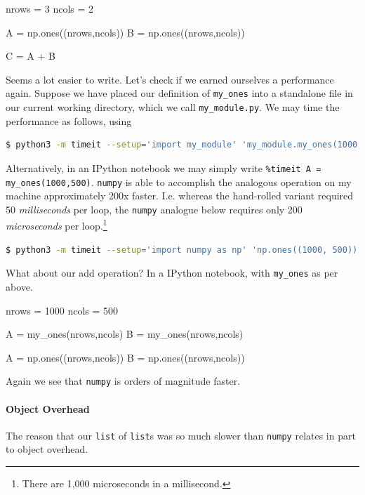 \documentclass[12pt,letterpaper,twoside]{article}
\begin{document}
\begin{python}
nrows = 3
ncols = 2

A = np.ones((nrows,ncols))
B = np.ones((nrows,ncols))

C = A + B
\end{python}

Seems a lot easier to write. Let's check if we earned ourselves a performance again.
Suppose we have placed our definition of \texttt{my\_ones} into a
standalone file in our current working directory, which we call
\texttt{my\_module.py}. We may time the performance as
follows, using
\begin{lstlisting}[language=bash,basicstyle=\small]
  $ python3 -m timeit --setup='import my_module' 'my_module.my_ones(1000, 500)'
\end{lstlisting}

Alternatively, in an IPython notebook we may simply
write \texttt{\%timeit A = my\_ones(1000,500)}.
\texttt{numpy} is able to accomplish the analogous operation on my
machine approximately 200x faster. I.e. whereas the hand-rolled variant required
50 \emph{milliseconds} per loop, the \texttt{numpy} analogue below
requires only 200 \emph{microseconds} per loop.\footnote{There are 1,000
microseconds in a millisecond.}

\begin{lstlisting}[language=bash,basicstyle=\small]
  $ python3 -m timeit --setup='import numpy as np' 'np.ones((1000, 500))'
\end{lstlisting}

What about our add operation? In a IPython notebook, with \texttt{my\_ones} as per above.

\begin{python}[basicstyle=\footnotesize]
nrows = 1000
ncols = 500

A = my_ones(nrows,ncols)
B = my_ones(nrows,ncols)

A = np.ones((nrows,ncols))
B = np.ones((nrows,ncols))
\end{python}

Again we see that \texttt{numpy} is orders of magnitude faster.

\paragraph{Object Overhead} The reason that our \texttt{list} of
\texttt{list}s was so much slower than \texttt{numpy} relates in part
to object overhead.
\end{document}
